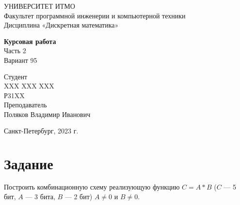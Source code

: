 \documentclass{article}
\begin{document}
\begin{center}
    УНИВЕРСИТЕТ ИТМО \\
    Факультет программной инженерии и компьютерной техники \\
    Дисциплина «Дискретная математика»
    
    \vspace{5cm}

    \large
    \textbf{Курсовая работа} \\
    Часть 2 \\
    Вариант 95
\end{center}

\vspace{2cm}

\hfill\begin{minipage}{0.35\linewidth}
Студент \\
XXX XXX XXX \\
Р31XX \\

Преподаватель \\
Поляков Владимир Иванович
\end{minipage}

\vfill

\begin{center}
    Санкт-Петербург, 2023 г.
\end{center}

\thispagestyle{empty}
\newpage

\section*{Задание}
Построить комбинационную схему реализующую функцию $C = A * B$ ($C$ --- 5 бит, $A$ --- 3 бита, $B$ --- 2 бит) $A \neq 0$ и $B \neq 0$.
\end{document}
